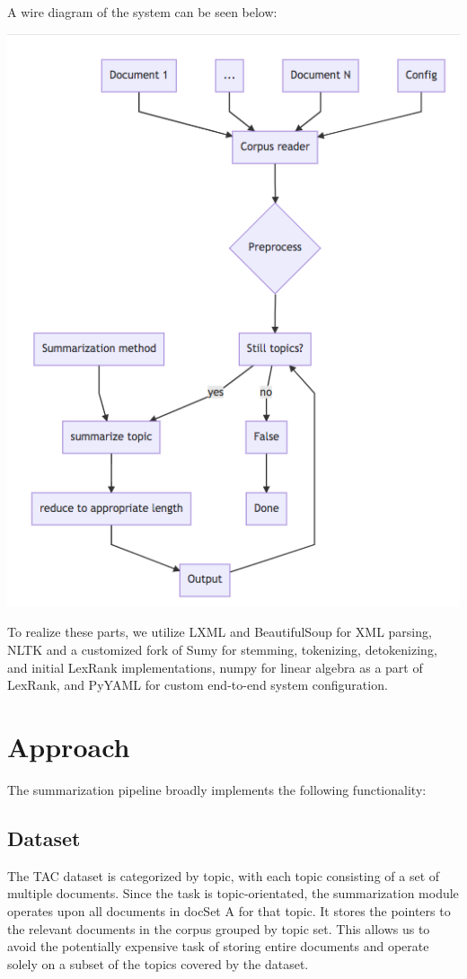 \documentclass[11pt]{article}
\begin{document}
A wire diagram of the system can be seen below:

\includegraphics[scale=0.4]{pipeline}

To realize these parts, we utilize LXML and BeautifulSoup for XML parsing, NLTK and a customized fork of Sumy for stemming, tokenizing, detokenizing, and initial LexRank implementations, numpy for linear algebra as a part of LexRank, and PyYAML for custom end-to-end system configuration.


\section{Approach}
The summarization pipeline broadly implements the following functionality:
\subsection{Dataset}
The TAC dataset is categorized by topic, with each topic consisting of a set of multiple documents. Since the task is topic-orientated, the summarization module operates upon all documents in docSet A for that topic. It stores the pointers to the relevant documents in the corpus grouped by topic set. This allows us to avoid the potentially expensive task of storing entire documents and operate solely on a subset of the topics covered by the dataset. 
\end{document}
